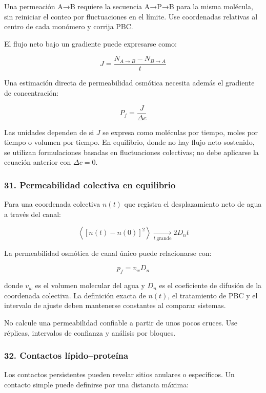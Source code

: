 \documentclass[
  spanish,
  11pt,
  a4paper]{article}
\begin{document}
Una permeación A→B requiere la secuencia A→P→B para la misma molécula,
sin reiniciar el conteo por fluctuaciones en el límite. Use coordenadas
relativas al centro de cada monómero y corrija PBC.

El flujo neto bajo un gradiente puede expresarse como:

\[
J=\frac{N_{A\rightarrow B}-N_{B\rightarrow A}}{t}
\]

Una estimación directa de permeabilidad osmótica necesita además el
gradiente de concentración:

\[
P_f=\frac{J}{\Delta c}
\]

Las unidades dependen de si \(J\) se expresa como moléculas por tiempo,
moles por tiempo o volumen por tiempo. En equilibrio, donde no hay flujo
neto sostenido, se utilizan formulaciones basadas en fluctuaciones
colectivas; no debe aplicarse la ecuación anterior con \(\Delta c=0\).

\subsubsection{31. Permeabilidad colectiva en
equilibrio}\label{permeabilidad-colectiva-en-equilibrio}

Para una coordenada colectiva \(n(t)\) que registra el desplazamiento
neto de agua a través del canal:

\[
\left\langle
[n(t)-n(0)]^2
\right\rangle
\xrightarrow[t\ \mathrm{grande}]{}
2D_n t
\]

La permeabilidad osmótica de canal único puede relacionarse con:

\[
p_f=v_wD_n
\]

donde \(v_w\) es el volumen molecular del agua y \(D_n\) es el
coeficiente de difusión de la coordenada colectiva. La definición exacta
de \(n(t)\), el tratamiento de PBC y el intervalo de ajuste deben
mantenerse constantes al comparar sistemas.

No calcule una permeabilidad confiable a partir de unos pocos cruces.
Use réplicas, intervalos de confianza y análisis por bloques.

\subsubsection{32. Contactos
lípido--proteína}\label{contactos-luxedpidoproteuxedna}

Los contactos persistentes pueden revelar sitios anulares o específicos.
Un contacto simple puede definirse por una distancia máxima:
\end{document}
